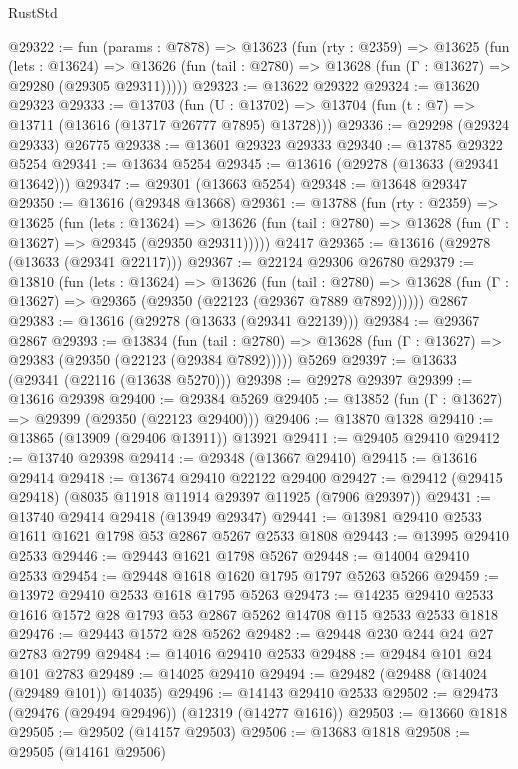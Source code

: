 \begin{lexlean}{RustStd}
\begin{coremodule}
@29322 := fun (params : @7878) =>
  @13623
    (fun (rty : @2359) =>
    @13625
      (fun (lets : @13624) =>
      @13626 (fun (tail : @2780) => @13628 (fun (Γ : @13627) => @29280 (@29305 @29311)))))
@29323 := @13622 @29322
@29324 := @13620 @29323
@29333 := @13703
    (fun (U : @13702) => @13704 (fun (t : @7) => @13711 (@13616 (@13717 @26777 @7895) @13728)))
@29336 := @29298 (@29324 @29333) @26775
@29338 := @13601 @29323 @29333
@29340 := @13785 @29322 @5254
@29341 := @13634 @5254
@29345 := @13616 (@29278 (@13633 (@29341 @13642)))
@29347 := @29301 (@13663 @5254)
@29348 := @13648 @29347
@29350 := @13616 (@29348 @13668)
@29361 := @13788
    (fun (rty : @2359) =>
    @13625
      (fun (lets : @13624) =>
      @13626 (fun (tail : @2780) => @13628 (fun (Γ : @13627) => @29345 (@29350 @29311)))))
    @2417
@29365 := @13616 (@29278 (@13633 (@29341 @22117)))
@29367 := @22124 @29306 @26780
@29379 := @13810
    (fun (lets : @13624) =>
    @13626
      (fun (tail : @2780) =>
      @13628 (fun (Γ : @13627) => @29365 (@29350 (@22123 (@29367 @7889 @7892))))))
    @2867
@29383 := @13616 (@29278 (@13633 (@29341 @22139)))
@29384 := @29367 @2867
@29393 := @13834
    (fun (tail : @2780) => @13628 (fun (Γ : @13627) => @29383 (@29350 (@22123 (@29384 @7892)))))
    @5269
@29397 := @13633 (@29341 (@22116 (@13638 @5270)))
@29398 := @29278 @29397
@29399 := @13616 @29398
@29400 := @29384 @5269
@29405 := @13852 (fun (Γ : @13627) => @29399 (@29350 (@22123 @29400)))
@29406 := @13870 @1328
@29410 := @13865 (@13909 (@29406 @13911)) @13921
@29411 := @29405 @29410
@29412 := @13740 @29398
@29414 := @29348 (@13667 @29410)
@29415 := @13616 @29414
@29418 := @13674 @29410 @22122 @29400
@29427 := @29412 (@29415 @29418) (@8035 @11918 @11914 @29397 @11925 (@7906 @29397))
@29431 := @13740 @29414 @29418 (@13949 @29347)
@29441 := @13981 @29410 @2533 @1611 @1621 @1798 @53 @2867 @5267 @2533 @1808
@29443 := @13995 @29410 @2533
@29446 := @29443 @1621 @1798 @5267
@29448 := @14004 @29410 @2533
@29454 := @29448 @1618 @1620 @1795 @1797 @5263 @5266
@29459 := @13972 @29410 @2533 @1618 @1795 @5263
@29473 := @14235 @29410 @2533 @1616 @1572 @28 @1793 @53 @2867 @5262 @14708 @115 @2533 @2533 @1818
@29476 := @29443 @1572 @28 @5262
@29482 := @29448 @230 @244 @24 @27 @2783 @2799
@29484 := @14016 @29410 @2533
@29488 := @29484 @101 @24 @101 @2783
@29489 := @14025 @29410
@29494 := @29482 (@29488 (@14024 (@29489 @101)) @14035)
@29496 := @14143 @29410 @2533
@29502 := @29473 (@29476 (@29494 @29496)) (@12319 (@14277 @1616))
@29503 := @13660 @1818
@29505 := @29502 (@14157 @29503)
@29506 := @13683 @1818
@29508 := @29505 (@14161 @29506)

\end{coremodule}
\end{lexlean}

